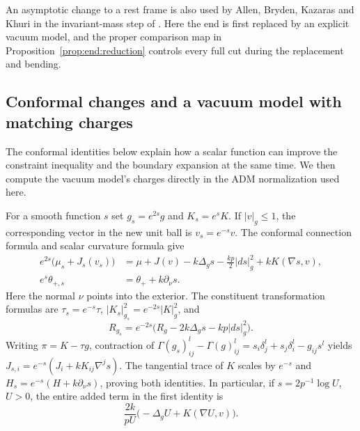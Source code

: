 An asymptotic change to a rest frame is also used by Allen, Bryden,
Kazaras and Khuri in the invariant-mass step of
\cite[Section~5]{AllenBrydenKazarasKhuri2025}. Here the end is first
replaced by an explicit vacuum model, and the proper comparison map in
Proposition~\ref{prop:end:reduction} controls every full cut during
the replacement and bending.

\subsection{Conformal changes and a vacuum model with matching charges}

The conformal identities below explain how a scalar function can
improve the constraint inequality and the boundary expansion at the
same time.  We then compute the vacuum model's charges directly in
the ADM normalization used here.

For a smooth function $s$ set $g_s=e^{2s}g$ and $K_s=e^sK$.
If $|v|_g\le1$, the corresponding vector in the new unit ball is
$v_s=e^{-s}v$.  The conformal connection formula and scalar curvature
formula give
\begin{equation}\label{eq:end:conformal}
\begin{aligned}
 e^{2s}\bigl(\mu_s+J_s(v_s)\bigr)
 &=\mu+J(v)-k\Delta_gs-\frac{kp}{2}|ds|_g^2
                  +kK(\nabla s,v),\\
 e^s\theta_{+,s}&=\theta_++k\partial_\nu s.
\end{aligned}
\end{equation}
Here the normal $\nu$ points into the exterior.  The constituent
transformation formulas are
$\tau_s=e^{-s}\tau$, $|K_s|_{g_s}^2=e^{-2s}|K|_g^2$, and
\[
 R_{g_s}=e^{-2s}\bigl(R_g-2k\Delta_gs-kp|ds|_g^2\bigr).
\]
Writing $\pi=K-\tau g$, contraction of
$\Gamma(g_s)^l_{ij}-\Gamma(g)^l_{ij}
=s_i\delta_j^l+s_j\delta_i^l-g_{ij}s^l$ yields
$J_{s,i}=e^{-s}(J_i+kK_{ij}\nabla^js)$.
The tangential trace of $K$ scales by $e^{-s}$ and
$H_s=e^{-s}(H+k\partial_\nu s)$, proving both identities.
In particular, if $s=2p^{-1}\log U$, $U>0$, the entire added term
in the first identity is
\begin{equation}\label{eq:end:conformal-U}
 \frac{2k}{pU}\bigl(-\Delta_gU+K(\nabla U,v)\bigr).
\end{equation}

